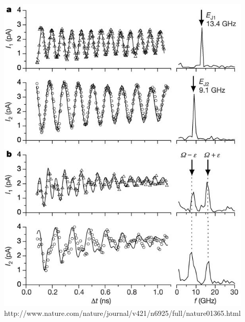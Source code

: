 \documentclass{beamer}
\begin{document}
\begin{frame}
\begin{columns}
\begin{figure}[ht!]
                \includegraphics[height=0.6\textheight]{img/probe-current-osc.jpg}
                \caption{http://www.nature.com/nature/journal/v421/n6925/full/nature01365.html}
            \end{figure}
    \end{columns}
\end{frame}

\end{document}
